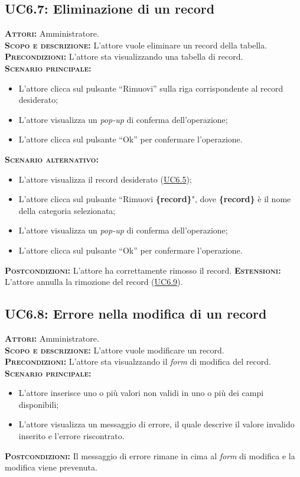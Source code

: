\subsection{UC6.7: Eliminazione di un record}
\label{sec:UC67}
\textsc{\textbf{Attori:}} Amministratore.\\
\textsc{\textbf{Scopo e descrizione:}} L'attore vuole eliminare un record della tabella.\\
\textsc{\textsc{\textbf{Precondizioni:}}} L'attore sta visualizzando una tabella di record.\\
\textsc{\textbf{Scenario principale:}}
\begin{itemize}
    \item L'attore clicca sul pulsante ``Rimuovi'' sulla riga corrispondente al record desiderato;
    \item L'attore visualizza un \textit{pop-up} di conferma dell'operazione;
    \item L'attore clicca sul pulsante ``Ok'' per confermare l'operazione.
\end{itemize}
\textsc{\textbf{Scenario alternativo:}}
\begin{itemize}
    \item L'attore visualizza il record desiderato (\hyperref[sec:UC65]{UC6.5});
    \item L'attore clicca sul pulsante ``Rimuovi \textbf{\{record\}}", dove \textbf{\{record\}} è il nome della categoria selezionata;
    \item L'attore visualizza un \textit{pop-up} di conferma dell'operazione;
    \item L'attore clicca sul pulsante ``Ok'' per confermare l'operazione.
\end{itemize}
\textsc{\textbf{Postcondizioni:}} L'attore ha correttamente rimosso il record.
\textsc{\textbf{Estensioni:}} L'attore annulla la rimozione del record (\hyperref[sec:UC69]{UC6.9}).

\subsection{UC6.8: Errore nella modifica di un record}
\label{sec:UC68}
\textsc{\textbf{Attori:}} Amministratore.\\
\textsc{\textbf{Scopo e descrizione:}} L'attore vuole modificare un record.\\
\textsc{\textsc{\textbf{Precondizioni:}}} L'attore sta visualzzando il \textit{form} di modifica del record.\\
\textsc{\textbf{Scenario principale:}} 
\begin{itemize}
    \item L'attore inserisce uno o più valori non validi in uno o più dei campi disponibili;
    \item L'attore visualizza un messaggio di errore, il quale descrive il valore invalido inserito e l'errore riscontrato.
\end{itemize}
\textsc{\textbf{Postcondizioni:}} Il messaggio di errore rimane in cima al \textit{form} di modifica e la modifica viene prevenuta.

